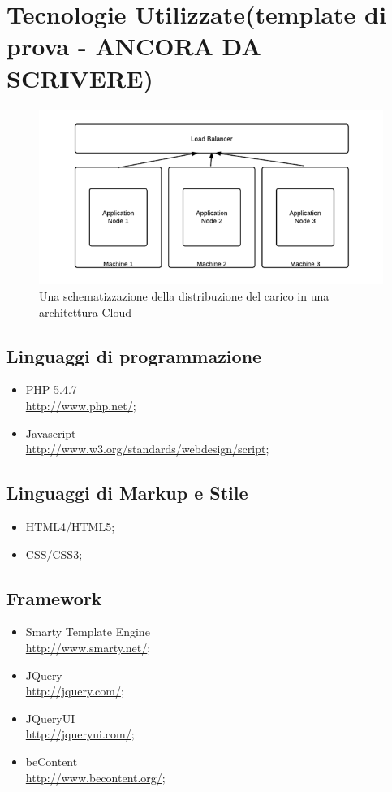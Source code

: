 \chapter{Tecnologie Utilizzate(template di prova - ANCORA DA SCRIVERE)}

\begin{figure}[h!]
	\centering
	\includegraphics[width=\textwidth,keepaspectratio=true]{capitoli/imgs/LoadBalancer.png}
	\caption{Una schematizzazione della distribuzione del carico in una architettura Cloud}
\end{figure}


  \section{Linguaggi di programmazione}
    \begin{itemize}
     \item PHP 5.4.7 \\
     \href{http://www.php.net/}{http://www.php.net/};
     \item Javascript \\
     \href{http://www.w3.org/standards/webdesign/script}{http://www.w3.org/standards/webdesign/script};
    \end{itemize}
   \section{Linguaggi di Markup e Stile}
    \begin{itemize}
     \item HTML4/HTML5;
     \item CSS/CSS3;
    \end{itemize}
   \section{Framework}
    \begin{itemize}
     \item Smarty Template Engine \\
	\href{http://www.smarty.net/}{http://www.smarty.net/};
     \item JQuery\\
	\href{http://jquery.com/}{http://jquery.com/};
     \item JQueryUI\\
	\href{http://jqueryui.com/}{http://jqueryui.com/};
     \item beContent\\
	\href{http://www.becontent.org/}{http://www.becontent.org/};
    \end{itemize}
